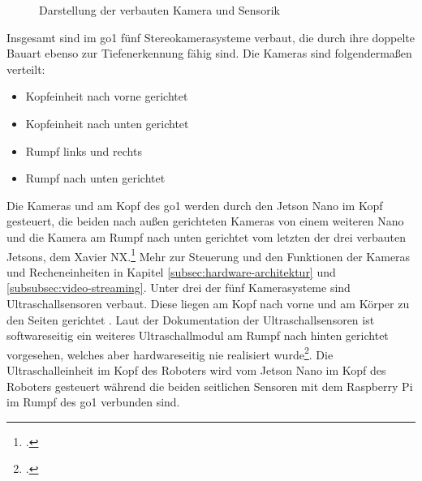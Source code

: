 \begin{figure}[h]
    \caption{Darstellung der verbauten Kamera und Sensorik}\label{fig:kameras_sensorik}
\end{figure}

\noindent Insgesamt sind im \gls{go1} fünf Stereokamerasysteme verbaut, die durch ihre doppelte Bauart ebenso zur Tiefenerkennung
fähig sind.
Die Kameras sind folgendermaßen verteilt:

\begin{itemize}
    \item {} Kopfeinheit nach vorne gerichtet
    \item {} Kopfeinheit nach unten gerichtet
    \item {} Rumpf links und rechts
    \item {} Rumpf nach unten gerichtet
\end{itemize}

Die Kameras  und  am Kopf des \gls{go1} werden durch den Jetson Nano im Kopf gesteuert, die beiden
nach außen gerichteten Kameras  von einem weiteren Nano und die Kamera am Rumpf nach unten gerichtet 
vom letzten der drei verbauten Jetsons, dem Xavier NX.\footcite{go1_kamera_anleitung}
Mehr zur Steuerung und den Funktionen der Kameras und Recheneinheiten in Kapitel \ref{subsec:hardware-architektur} und
\ref{subsubsec:video-streaming}.
Unter drei der fünf Kamerasysteme sind Ultraschallsensoren verbaut.
Diese liegen am Kopf nach vorne  und am Körper zu den Seiten gerichtet .
Laut der Dokumentation der Ultraschallsensoren ist softwareseitig ein weiteres Ultraschallmodul am Rumpf nach hinten
gerichtet  vorgesehen, welches aber hardwareseitig nie realisiert wurde\footcite{go1_ultraschall_anleitung}.
Die Ultraschalleinheit im Kopf des Roboters wird vom Jetson Nano im Kopf des Roboters gesteuert während die beiden seitlichen
Sensoren mit dem Raspberry Pi im Rumpf des \gls{go1} verbunden sind.


